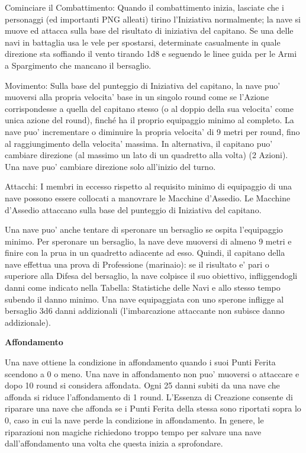 \documentclass[a4paper,11pt,twoside,openany]{book}
\begin{document}
{{Cominciare il Combattimento:} Quando il combattimento inizia, lasciate che i personaggi (ed importanti PNG alleati) tirino l'Iniziativa normalmente; la nave si muove ed attacca sulla base del risultato di iniziativa del capitano. Se una delle navi in battaglia usa le vele per spostarsi, determinate casualmente in quale direzione sta soffiando il vento tirando 1d8 e seguendo le linee guida per le Armi a Spargimento che mancano il bersaglio.{}

{Movimento:} Sulla base del punteggio di Iniziativa del capitano, la nave puo' muoversi alla propria velocita' base in un singolo round come se l'Azione corrispondesse a quella del capitano stesso (o al doppio della sua velocita' come unica azione del round), finché ha il proprio equipaggio minimo al completo. La nave puo' incrementare o diminuire la propria velocita' di 9 metri per round, fino al raggiungimento della velocita' massima. In alternativa, il capitano puo' cambiare direzione (al massimo un lato di un quadretto alla volta) (2 Azioni). Una nave puo' cambiare direzione solo all'inizio del turno.{}

{Attacchi:} I membri in eccesso rispetto al requisito minimo di equipaggio di una nave possono essere collocati a manovrare le Macchine d'Assedio. Le Macchine d'Assedio attaccano sulla base del punteggio di Iniziativa del capitano.{}

Una nave puo' anche tentare di speronare un bersaglio se ospita l'equipaggio minimo. Per speronare un bersaglio, la nave deve muoversi di almeno 9 metri e finire con la prua in un quadretto adiacente ad esso. 
Quindi, il capitano della nave effettua una prova di Professione (marinaio): se il risultato e' pari o superiore alla Difesa del bersaglio, la nave colpisce il suo obiettivo, infliggendogli danni come indicato nella Tabella: Statistiche delle Navi e allo stesso tempo subendo il danno minimo. Una nave equipaggiata con uno sperone infligge al bersaglio 3d6 danni addizionali (l'imbarcazione attaccante non subisce danno addizionale).

\textbf{Affondamento}

Una nave ottiene la condizione in affondamento quando i suoi Punti Ferita scendono a 0 o meno. Una nave in affondamento non puo' muoversi o attaccare e dopo 10 round si considera affondata. Ogni 25 danni subiti da una nave che affonda si riduce l'affondamento di 1 round. L’Essenza di Creazione consente di riparare una nave che affonda se i Punti Ferita della stessa sono riportati sopra lo 0, caso in cui la nave perde la condizione in affondamento. In genere, le riparazioni non magiche richiedono troppo tempo per salvare una nave dall'affondamento una volta che questa inizia a sprofondare.

}
\end{document}
